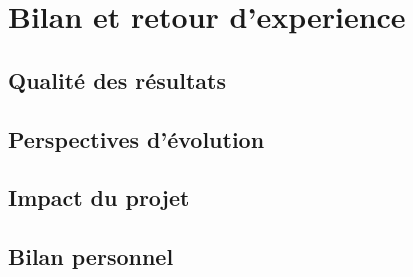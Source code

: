 \chapter{Bilan et retour d'experience}

	\section{Qualité des résultats}

	\section{Perspectives d'évolution}
	
	\section{Impact du projet}
	
	\section{Bilan personnel}
	
